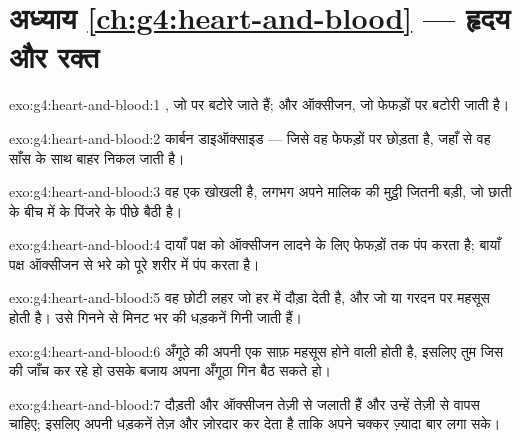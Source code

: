 \section*{अध्याय \ref{ch:g4:heart-and-blood} --- हृदय और रक्त}

\begin{solution}{exo:g4:heart-and-blood:1}
, जो  पर बटोरे जाते हैं; और ऑक्सीजन, जो फेफड़ों पर
बटोरी जाती है।
\end{solution}

\begin{solution}{exo:g4:heart-and-blood:2}
कार्बन डाइऑक्साइड --- जिसे वह फेफड़ों पर छोड़ता है, जहाँ से वह साँस के
साथ बाहर निकल जाती है।
\end{solution}

\begin{solution}{exo:g4:heart-and-blood:3}
वह एक खोखली  है, लगभग अपने मालिक की मुट्ठी जितनी बड़ी, जो छाती के
बीच में  के पिंजरे के पीछे बैठी है।
\end{solution}

\begin{solution}{exo:g4:heart-and-blood:4}
दायाँ पक्ष  को ऑक्सीजन लादने के लिए फेफड़ों तक पंप करता है; बायाँ
पक्ष ऑक्सीजन से भरे  को पूरे शरीर में पंप करता है।
\end{solution}

\begin{solution}{exo:g4:heart-and-blood:5}
वह छोटी लहर जो हर   में दौड़ा देती है, और जो  या गरदन
पर महसूस होती है। उसे गिनने से मिनट भर की धड़कनें गिनी जाती हैं।
\end{solution}

\begin{solution}{exo:g4:heart-and-blood:6}
अँगूठे की अपनी एक साफ़ महसूस होने वाली  होती है, इसलिए तुम जिस
 की जाँच कर रहे हो उसके बजाय अपना अँगूठा गिन बैठ सकते हो।
\end{solution}

\begin{solution}{exo:g4:heart-and-blood:7}
दौड़ती   और ऑक्सीजन तेज़ी से जलाती हैं और उन्हें तेज़ी
से वापस चाहिए; इसलिए  अपनी धड़कनें तेज़ और ज़ोरदार कर देता है ताकि
 अपने चक्कर ज़्यादा बार लगा सके।
\end{solution}

